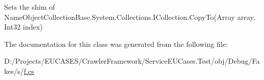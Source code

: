 Sets the shim of Name\-Object\-Collection\-Base.\-System.\-Collections.\-I\-Collection.\-Copy\-To(\-Array array, Int32 index)



The documentation for this class was generated from the following file\-:\begin{DoxyCompactItemize}
\item 
D\-:/\-Projects/\-E\-U\-C\-A\-S\-E\-S/\-Crawler\-Framework/\-Service\-E\-U\-Cases.\-Test/obj/\-Debug/\-Fakes/s/\hyperlink{s_2f_8cs}{f.\-cs}\end{DoxyCompactItemize}
